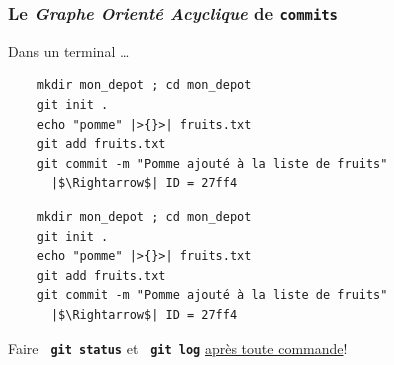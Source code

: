 \documentclass[table,tikz,12pt,svgnames]{beamer}
\begin{document}
\begin{frame}[fragile]
\frametitle{Le \textit{Graphe Orienté Acyclique} de \texttt{commits}}
 	\begin{figure}
	\end{figure}

	\begin{block}{Dans un terminal \ldots}
	\begin{overprint}
	\vspace{-0.3cm}
	\begin{semiTransparentBox}
	\begin{verbatim}
	mkdir mon_depot ; cd mon_depot
	git init .
	echo "pomme" |>{}>| fruits.txt
	git add fruits.txt
	git commit -m "Pomme ajouté à la liste de fruits"
	  |$\Rightarrow$| ID = 27ff4
	\end{verbatim}
	\end{semiTransparentBox}

	\vspace{-0.3cm}
	\begin{solidBox}
	\begin{verbatim}
	mkdir mon_depot ; cd mon_depot
	git init .
	echo "pomme" |>{}>| fruits.txt
	git add fruits.txt
	git commit -m "Pomme ajouté à la liste de fruits"
	  |$\Rightarrow$| ID = 27ff4
	\end{verbatim}
	\end{solidBox}
	\end{overprint}
	\end{block}
	

	Faire \textbf{\texttt{ git status}} et \textbf{\texttt{ git log}} \underline{après toute commande}!
\end{frame}
\end{document}
